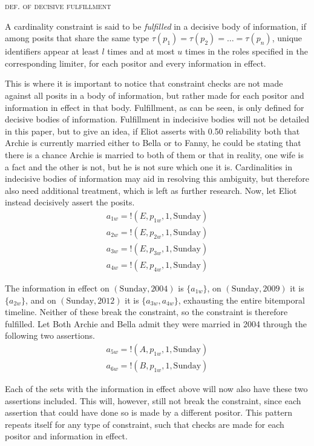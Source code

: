 \documentclass[sfsidenotes,nobib,twoside,symmetric]{tufte-handout}
\newcommand{\assert}{\text{!}}
\newcommand{\typeof}[1]{\tau(#1)}
\newcounter{majorcount}
\newcommand{\deffy}[3]{
	\vspace{2ex}
	\refstepcounter{majorcount} 
	\noindent\textsc{#1}%
	\\\begin{small}
	\noindent #2%
	\label{Def:#3}
	\end{small}
	\vspace{2ex}
}
\begin{document}
\deffy{def. of decisive fulfillment}{%
A cardinality constraint is said to be \emph{fulfilled} in a decisive body of information, if among posits that share the same type $\typeof{p_1} = \typeof{p_2} = \ldots = \typeof{p_n}$, unique identifiers appear at least $l$ times and at most $u$ times in the roles specified in the corresponding limiter, for each positor and every information in effect.
}{deful}

This is where it is important to notice that constraint checks are not made against all posits in a body of information, but rather made for each positor and information in effect in that body. Fulfillment, as can be seen, is only defined for decisive bodies of information. Fulfillment in indecisive bodies will not be detailed in this paper, but to give an idea, if Eliot asserts with 0.50 reliability both that Archie is currently married either to Bella or to Fanny, he could be stating that there is a chance Archie is married to both of them or that in reality, one wife is a fact and the other is not, but he is not sure which one it is. Cardinalities in indecisive bodies of information may aid in resolving this ambiguity, but therefore also need additional treatment, which is left as further research. Now, let Eliot instead decisively assert the posits. 
\begin{align*}
a_{1w} = \assert(E, p_{1w}, 1, \textrm{Sunday}) \\
a_{2w} = \assert(E, p_{2w}, 1, \textrm{Sunday}) \\
a_{3w} = \assert(E, p_{3w}, 1, \textrm{Sunday}) \\
a_{4w} = \assert(E, p_{4w}, 1, \textrm{Sunday}) 
\end{align*}

The information in effect on $(\textrm{Sunday}, 2004)$ is $\{a_{1w}\}$, on $(\textrm{Sunday}, 2009)$ it is $\{a_{2w}\}$, and on $(\textrm{Sunday}, 2012)$ it is $\{a_{3w}, a_{4w}\}$, exhausting the entire bitemporal timeline. Neither of these break the constraint, so the constraint is therefore fulfilled. Let Both Archie and Bella admit they were married in 2004 through the following two assertions.
\begin{align*}
a_{5w} = \assert(A, p_{1w}, 1, \textrm{Sunday}) \\
a_{6w} = \assert(B, p_{1w}, 1, \textrm{Sunday}) 
\end{align*}

Each of the sets with the information in effect above will now also have these two assertions included. This will, however, still not break the constraint, since each assertion that could have done so is made by a different positor. This pattern repeats itself for any type of constraint, such that checks are made for each positor and information in effect. 
\end{document}
